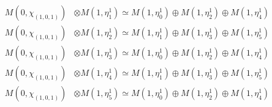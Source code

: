 \begin{align*}
M(0,\chi_{(1,0,1)}) &\otimes M(1,\eta^{1}_{1}) \simeq M(1,\eta^{1}_{0}) \oplus M(1,\eta^{1}_{2}) \oplus M(1,\eta^{1}_{4}) \\
M(0,\chi_{(1,0,1)}) &\otimes M(1,\eta^{1}_{2}) \simeq M(1,\eta^{1}_{1}) \oplus M(1,\eta^{1}_{3}) \oplus M(1,\eta^{1}_{5}) \\
M(0,\chi_{(1,0,1)}) &\otimes M(1,\eta^{1}_{3}) \simeq M(1,\eta^{1}_{0}) \oplus M(1,\eta^{1}_{2}) \oplus M(1,\eta^{1}_{4}) \\
M(0,\chi_{(1,0,1)}) &\otimes M(1,\eta^{1}_{4}) \simeq M(1,\eta^{1}_{1}) \oplus M(1,\eta^{1}_{3}) \oplus M(1,\eta^{1}_{5}) \\
M(0,\chi_{(1,0,1)}) &\otimes M(1,\eta^{1}_{5}) \simeq M(1,\eta^{1}_{0}) \oplus M(1,\eta^{1}_{2}) \oplus M(1,\eta^{1}_{4}) \\
\end{align*}


